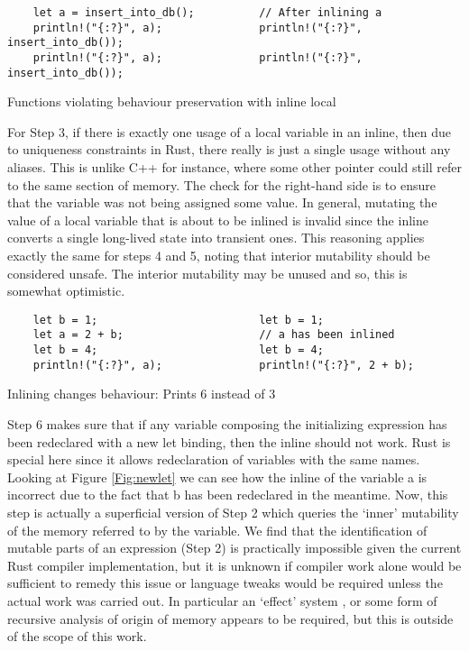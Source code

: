 \begin{fig}[H]
\begin{verbatim}
    let a = insert_into_db();          // After inlining a
    println!("{:?}", a);               println!("{:?}", insert_into_db());
    println!("{:?}", a);               println!("{:?}", insert_into_db());
\end{verbatim}
\caption{Functions violating behaviour preservation with inline local}
\label{Fig:funcinline}
\end{fig}

For Step 3, if there is exactly one usage of a local variable in an inline, then due to uniqueness constraints in Rust, there really is just a single usage without any aliases. This is unlike C++ for instance, where some other pointer could still refer to the same section of memory. The check for the right-hand side is to ensure that the variable was not being assigned some value. In general, mutating the value of a local variable that is about to be inlined is invalid since the inline converts a single long-lived state into transient ones. This reasoning applies exactly the same for steps 4 and 5, noting that interior mutability should be considered unsafe. The interior mutability may be unused and so, this is somewhat optimistic.

\begin{fig}[H]
\begin{verbatim}
    let b = 1;                         let b = 1;
    let a = 2 + b;                     // a has been inlined
    let b = 4;                         let b = 4;
    println!("{:?}", a);               println!("{:?}", 2 + b);
\end{verbatim}
\caption{Inlining changes behaviour: Prints 6 instead of 3}
\label{Fig:newlet}
\end{fig}

Step 6 makes sure that if any variable composing the initializing expression has been redeclared with a new let binding, then the inline should not work. Rust is special here since it allows redeclaration of variables with the same names. Looking at Figure \ref{Fig:newlet} we can see how the inline of the variable a is incorrect due to the fact that b has been redeclared in the meantime. Now, this step is actually a superficial version of Step 2 which queries the `inner' mutability of the memory referred to by the variable. We find that the identification of mutable parts of an expression (Step 2) is practically impossible given the current Rust compiler implementation, but it is unknown if compiler work alone would be sufficient to remedy this issue or language tweaks would be required unless the actual work was carried out. In particular an `effect' system \cite{effects}, or some form of recursive analysis of origin of memory appears to be required, but this is outside of the scope of this work.



